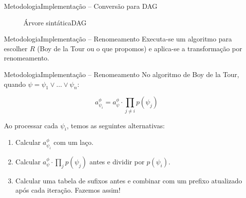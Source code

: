 \begin{frame}{Metodologia}{Implementação -- Conversão para DAG}
	\begin{figure}
		\centering
		
		\hspace{1cm}
		\raisebox{7\height}{$\longmapsto$}
		\hspace{1cm}
		
		\hspace{.5cm}Árvore sintática\hspace{3.5cm}DAG
	\end{figure}
\end{frame}

\begin{frame}{Metodologia}{Implementação -- Renomeamento}
	Executa-se um algoritmo para escolher $R$ (Boy de la Tour ou o que propomos) e aplica-se a transformação por renomeamento.
\end{frame}

\begin{frame}{Metodologia}{Implementação -- Renomeamento}
	No algoritmo de Boy de la Tour, quando $\psi = \psi_1 \vee ... \vee \psi_n$:
	
	\pause $$a_{\psi_i}^\phi = a_\psi^\phi \cdot \prod_{j \neq i} p(\psi_j)$$
	
	\pause Ao processar cada $\psi_i$, temos as seguintes alternativas:
	\begin{enumerate}
		\pause\item Calcular $a_{\psi_i}^\phi$ com um laço.
		\pause\item Calcular $a_\psi^\phi \cdot \prod_{j} p(\psi_j)$ antes e dividir por $p(\psi_i)$.
		\pause\item Calcular uma tabela de sufixos antes e combinar com um prefixo atualizado após cada iteração. \pause Fazemos assim!
	\end{enumerate}
\end{frame}

